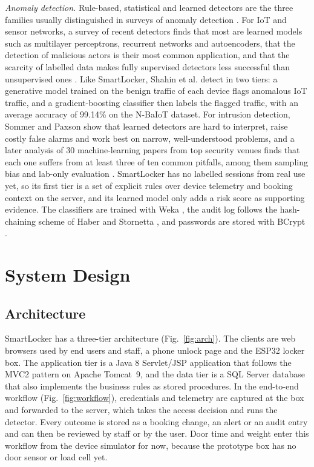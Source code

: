 \textit{Anomaly detection.} Rule-based, statistical and learned detectors are the three families usually distinguished
in surveys of anomaly detection \cite{chandola2009anomaly, ahmed2016survey}. For IoT and sensor networks, a survey of
recent detectors finds that most are learned models such as multilayer perceptrons, recurrent networks and
autoencoders, that the detection of malicious actors is their most common application, and that the scarcity of
labelled data makes fully supervised detectors less successful than unsupervised ones \cite{demedeiros2023anomaly}.
Like SmartLocker, Shahin et al. \cite{shahin2025twostage} detect in two tiers: a generative model trained on the benign
traffic of each device flags anomalous IoT traffic, and a gradient-boosting classifier then labels the flagged traffic,
with an average accuracy of 99.14\% on the N-BaIoT dataset. For intrusion detection, Sommer and Paxson
\cite{sommer2010outside} show that learned detectors are hard to interpret, raise costly false alarms and work best on
narrow, well-understood problems, and a later analysis of 30 machine-learning papers from top security venues finds
that each one suffers from at least three of ten common pitfalls, among them sampling bias and lab-only evaluation
\cite{arp2024pitfalls}. SmartLocker has no labelled sessions from real use yet, so its first tier is a set of explicit
rules over device telemetry and booking context on the server, and its learned model only adds a risk score as
supporting evidence. The classifiers are trained with Weka
\cite{hall2009weka}, the audit log follows the hash-chaining scheme of Haber and Stornetta \cite{haber1991timestamp},
and passwords are stored with BCrypt \cite{provos1999bcrypt}.

\section{System Design}

\subsection{Architecture}

SmartLocker has a three-tier architecture (Fig.~\ref{fig:arch}). The clients are web browsers used by end users and
staff, a phone unlock page and the ESP32 locker box. The application tier is a Java 8 Servlet/JSP application that
follows the MVC2 pattern on Apache Tomcat~9, and the data tier is a SQL Server database that also implements the
business rules as stored procedures. In the end-to-end workflow (Fig.~\ref{fig:workflow}), credentials and telemetry
are captured at the box and forwarded to the server, which takes the access decision and runs the detector. Every
outcome is stored as a booking change, an alert or an audit entry and can then be reviewed by staff or by the user.
Door time and weight enter this workflow from the device simulator for now, because the prototype box has no door
sensor or load cell yet.

